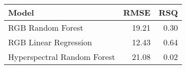 \captionsetup[table]{labelformat=empty,skip=1pt}
\begin{longtable}{lrr}
\toprule
Model & RMSE & RSQ \\ 
\midrule
RGB Random Forest & 19.21 & 0.30 \\ 
RGB Linear Regression & 12.43 & 0.64 \\ 
Hyperspectral Random Forest & 21.08 & 0.02 \\ 
\bottomrule
\end{longtable}

